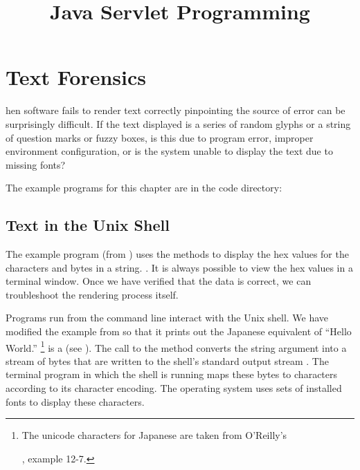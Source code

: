 \chapter{Text Forensics}\label{chap:forensics}

hen software fails to render text correctly
pinpointing the source of error can be surprisingly difficult.
If the text displayed is a series of random glyphs or a string of
question marks or fuzzy boxes, is this due to program error,
improper environment configuration, or is the system unable to
display the text due to missing fonts?

The example programs for this chapter are in the code directory:
%



\section{Text in the Unix Shell}

The example program 
(from )
uses the methods 
to display the hex values for the characters and bytes
in a string.
.
%
%
It is always possible to view the hex values in a terminal window.
Once we have verified that the data is correct, we can
troubleshoot the rendering process itself.

Programs run from the command line interact with the Unix shell.
We have modified the  example from 
so that it prints out the Japanese equivalent of ``Hello World.''%
%
\footnote{The unicode characters for Japanese are taken from
O'Reilly's \title{Java Servlet Programming}, example 12-7.}
%
%
 is a  (see ).
The call to the  method converts the string argument into 
a stream of bytes that are written to the shell's standard output stream .
The terminal program in which the shell is running maps 
these bytes to characters according to its character encoding.
The operating system uses sets of installed fonts to display these characters.

